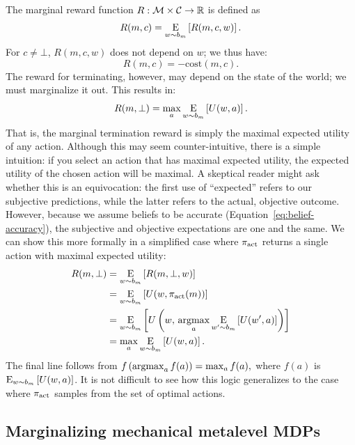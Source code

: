 The marginal reward function $R: \M \times \C \rightarrow \R$ is defined as
%
\begin{equation}
R(m, c) = \expectunder{R(m, c, w)}{w \sim b_m}.
\end{equation}
%
For $c \neq \bot$, $R(m, c, w)$ does not depend on $w$; we thus have:
%
\begin{equation}
  R(m, c) = -\text{cost}(m, c).
\end{equation}
The reward for terminating, however, may depend on the state of the world; we must marginalize it out. This results in:
%
\begin{equation}\label{eq:marginal-term}
  R(m, \bot) = \max_a \expectunder{U(w, a)}{w \sim b_m}.
\end{equation}
%
That is, the marginal termination reward is simply the maximal expected utility of any action. Although this may seem counter-intuitive, there is a simple intuition: if you select an action that has maximal expected utility, the expected utility of the chosen action will be maximal. A skeptical reader might ask whether this is an equivocation: the first use of ``expected'' refers to our subjective predictions, while the latter refers to the actual, objective outcome. However, because we assume beliefs to be accurate (Equation~\ref{eq:belief-accuracy}), the subjective and objective expectations are one and the same. We can show this more formally in a simplified case where $\pi\act$ returns a single action with maximal expected utility:
\begin{equation}
\begin{aligned}
R(m, \bot)
&= \expectunder{R(m, \bot, w)}{w \sim b_m} \\
&= \expectunder{U(w, \pi\act(m))}{w \sim b_m} \\
&= \expectunder{U\left(w,\, \argmax_a \expectunder{U(w', a)}{w' \sim b_m}\right)}{w \sim b_m} \\
&= \max_a \expectunder{U(w, a)}{w \sim b_m}
.
\end{aligned}
\end{equation}
%
The final line follows from
%
\begin{math}
  f\left(\argmax_a f(a)\right) = \max_a f(a)
  ,
\end{math}
%
where $f(a)$ is $\expectunder{U(w, a)}{w \sim b_m}$. It is not difficult to see how this logic generalizes to the case where $\pi\act$ samples from the set of optimal actions.

\subsection{Marginalizing mechanical metalevel MDPs}\label{sec:marginal-mechanical}

